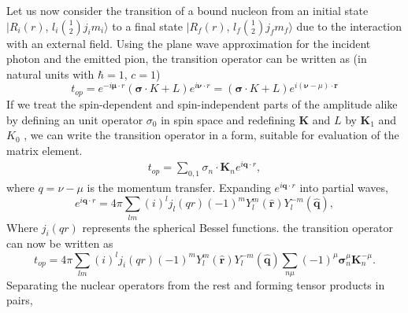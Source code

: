 Let us now consider the transition of a bound nucleon from an initial state $|R_i (r)$, $l_i \binom{1}{2} j_i m_i \rangle$ to a final state $|R_f (r)$, $l_f \binom{1}{2} j_f m_f \rangle$ due to the interaction with an external field. Using the plane wave approximation for the incident photon and the emitted pion, the transition operator can be written as (in natural units with $\hbar =1$, $c=1$)
\setcounter{equation}{36}
\begin{equation}
  t_{op}= e^{-i {\boldsymbol  \mu \cdot r}} ({\boldsymbol  \sigma \cdot K} + L)e^{i {\boldsymbol  \nu \cdot r}}= ({\boldsymbol  \sigma \cdot K}+ L) e^{i ({\boldsymbol  \nu - \mu})\cdot {\boldsymbol  r}} \label{chap3-eq37}
\end{equation}
If we treat the spin-dependent and spin-independent parts of the amplitude alike by defining an unit operator $\sigma_0$ in spin space and redefining ${\boldsymbol  K}$ and $L$ by ${\boldsymbol  K_1}$ and $K_0$ , we can write the transition operator in a form, suitable for evaluation of the matrix element.
\begin{align}
  t_{op} = \sum_{0, 1} \sigma_n \cdot {\boldsymbol  K}_n e^{i{\boldsymbol  q \cdot r}}, \label{chap3-eq38}
\end{align}
where $q= \nu- \mu$ is the momentum transfer. Expanding $e^{i {\boldsymbol  q \cdot r}}$ into partial waves,
\begin{equation}
  e^{i {\boldsymbol  q \cdot r}} = 4 \pi \sum_{lm} (i)^l j_l (qr) (-1)^{m}Y_l^m (\hat{{\boldsymbol  r}}) Y_l^{-m} (\hat{{\boldsymbol  q}}), \label{chap3-eq39}
\end{equation}
Where $j_i (qr)$ represents the spherical Bessel functions. the transition operator can now be written as
\begin{equation}
 t_{op}= 4 \pi \sum_{lm} (i)^l j_i (qr) (-1)^m Y_l^m (\hat{{\boldsymbol  r}}) Y_l^{-m} (\hat{{\boldsymbol  q}}) \sum_{n\mu} (-1)^\mu {\boldsymbol \sigma}_n^\mu {\boldsymbol K}_n^{-\mu}. \label{chap3-eq40}
\end{equation}
Separating the nuclear operators from the rest and forming tensor products in pairs,
